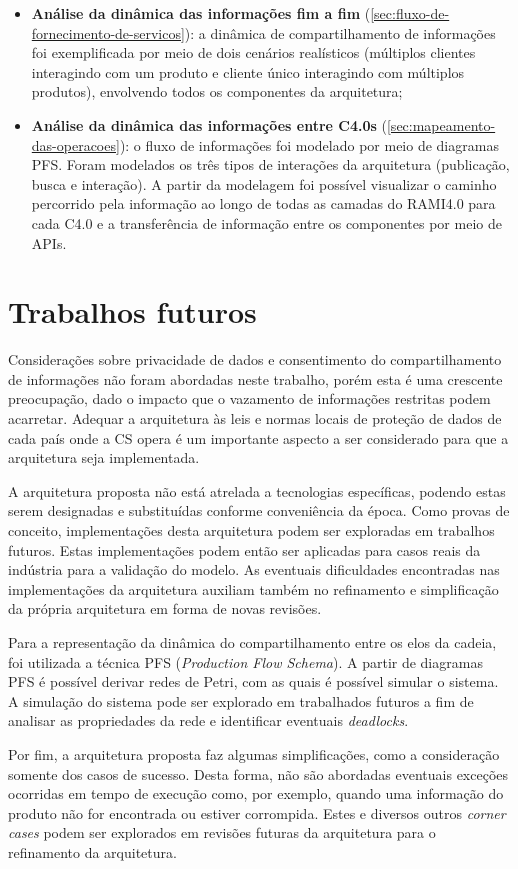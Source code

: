 \begin{itemize}
  \item \textbf{Análise da dinâmica das informações fim a fim} (\autoref{sec:fluxo-de-fornecimento-de-servicos}): a dinâmica de compartilhamento de informações foi exemplificada por meio de dois cenários realísticos (múltiplos clientes interagindo com um produto e cliente único interagindo com múltiplos produtos), envolvendo todos os componentes da arquitetura;
  \item \textbf{Análise da dinâmica das informações entre C4.0s} (\autoref{sec:mapeamento-das-operacoes}): o fluxo de informações foi modelado por meio de diagramas PFS. Foram modelados os três tipos de interações da arquitetura (publicação, busca e interação). A partir da modelagem foi possível visualizar o caminho percorrido pela informação ao longo de todas as camadas do RAMI4.0 para cada C4.0 e a transferência de informação entre os componentes por meio de APIs.
\end{itemize}

\section{Trabalhos futuros}

Considerações sobre privacidade de dados e consentimento do compartilhamento de informações não foram abordadas neste trabalho, porém esta é uma crescente preocupação, dado o impacto que o vazamento de informações restritas podem acarretar. Adequar a arquitetura às leis e normas locais de proteção de dados de cada país onde a CS opera é um importante aspecto a ser considerado para que a arquitetura seja implementada.

A arquitetura proposta não está atrelada a tecnologias específicas, podendo estas serem designadas e substituídas conforme conveniência da época. Como provas de conceito, implementações desta arquitetura podem ser exploradas em trabalhos futuros. Estas implementações podem então ser aplicadas para casos reais da indústria para a validação do modelo. As eventuais dificuldades encontradas nas implementações da arquitetura auxiliam também no refinamento e simplificação da própria arquitetura em forma de novas revisões.

Para a representação da dinâmica do compartilhamento entre os elos da cadeia, foi utilizada a técnica PFS (\textit{Production Flow Schema}). A partir de diagramas PFS é possível derivar redes de Petri, com as quais é possível simular o sistema. A simulação do sistema pode ser explorado em trabalhados futuros a fim de analisar as propriedades da rede e identificar eventuais \textit{deadlocks}.

Por fim, a arquitetura proposta faz algumas simplificações, como a consideração somente dos casos de sucesso. Desta forma, não são abordadas eventuais exceções ocorridas em tempo de execução como, por exemplo, quando uma informação do produto não for encontrada ou estiver corrompida. Estes e diversos outros \textit{corner cases} podem ser explorados em revisões futuras da arquitetura para o refinamento da arquitetura.
